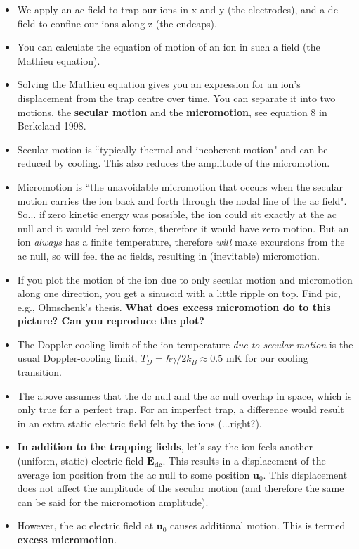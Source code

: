 \documentclass{article}
\begin{document}
\begin{itemize}
\item We apply an ac field to trap our ions in x and y (the electrodes), and a dc field to confine our ions along z (the endcaps).
\item You can calculate the equation of motion of an ion in such a field (the Mathieu equation).
\item Solving the Mathieu equation gives you an expression for an ion's displacement from the trap centre over time. You can separate it into two motions, the \textbf{secular motion} and the \textbf{micromotion}, see equation 8 in Berkeland 1998. 
\item Secular motion is ``typically thermal and incoherent motion" and can be reduced by cooling. This also reduces the amplitude of the micromotion.
\item Micromotion is ``the unavoidable micromotion that occurs when the secular motion carries the ion back and forth through the nodal line of the ac field". So... if zero kinetic energy was possible, the ion could sit exactly at the ac null and it would feel zero force, therefore it would have zero motion. But an ion \textit{always} has a finite temperature, therefore \textit{will} make excursions from the ac null, so will feel the ac fields, resulting in (inevitable) micromotion.
\item If you plot the motion of the ion due to only secular motion and micromotion along one direction, you get a sinusoid with a little ripple on top. Find pic, e.g., Olmschenk's thesis. \textbf{What does excess micromotion do to this picture? Can you reproduce the plot?}
\item The Doppler-cooling limit of the ion temperature \textit{due to secular motion} is the usual Doppler-cooling limit, $T_D = \hbar \gamma / 2 k_B \approx 0.5$ mK for our cooling transition.
\item The above assumes that the dc null and the ac null overlap in space, which is only true for a perfect trap. For an imperfect trap, a difference would result in an extra static electric field felt by the ions (...right?).
\item \textbf{In addition to the trapping fields}, let's say the ion feels another (uniform, static) electric field $\mathbf{E_{dc}}$. This results in a displacement of the average ion position from the ac null to some position $\mathbf{u}_0$. This displacement does not affect the amplitude of the secular motion (and therefore the same can be said for the micromotion amplitude).
\item However, the ac electric field at $\mathbf{u}_0$ causes additional motion. This is termed \textbf{excess micromotion}. 
\end{itemize}
\end{document}
